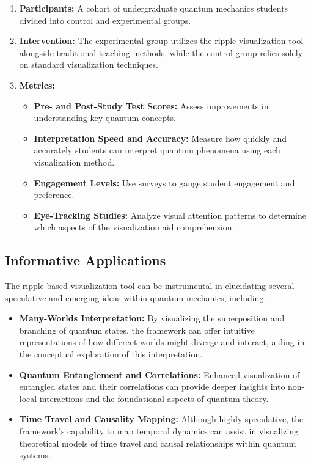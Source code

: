 \documentclass[12pt]{article}
\begin{document}
\begin{enumerate}
    \item \textbf{Participants:} A cohort of undergraduate quantum mechanics students divided into control and experimental groups.
    \item \textbf{Intervention:} The experimental group utilizes the ripple visualization tool alongside traditional teaching methods, while the control group relies solely on standard visualization techniques.
    \item \textbf{Metrics:}
    \begin{itemize}
        \item \textbf{Pre- and Post-Study Test Scores:} Assess improvements in understanding key quantum concepts.
        \item \textbf{Interpretation Speed and Accuracy:} Measure how quickly and accurately students can interpret quantum phenomena using each visualization method.
        \item \textbf{Engagement Levels:} Use surveys to gauge student engagement and preference.
        \item \textbf{Eye-Tracking Studies:} Analyze visual attention patterns to determine which aspects of the visualization aid comprehension.
    \end{itemize}
\end{enumerate}

\subsection{Informative Applications}

The ripple-based visualization tool can be instrumental in elucidating several speculative and emerging ideas within quantum mechanics, including:
\begin{itemize}
    \item \textbf{Many-Worlds Interpretation:} By visualizing the superposition and branching of quantum states, the framework can offer intuitive representations of how different worlds might diverge and interact, aiding in the conceptual exploration of this interpretation.
    \item \textbf{Quantum Entanglement and Correlations:} Enhanced visualization of entangled states and their correlations can provide deeper insights into non-local interactions and the foundational aspects of quantum theory.
    \item \textbf{Time Travel and Causality Mapping:} Although highly speculative, the framework's capability to map temporal dynamics can assist in visualizing theoretical models of time travel and causal relationships within quantum systems.
\end{itemize}
\end{document}
